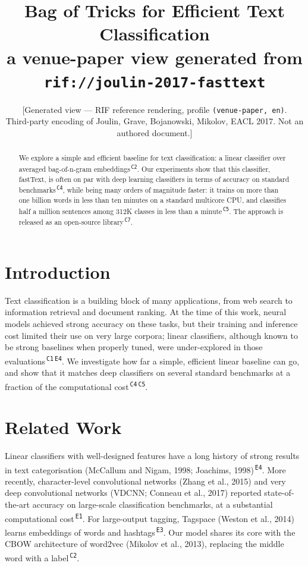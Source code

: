 \documentclass[10pt,twocolumn]{article}
\title{\large\bfseries Bag of Tricks for Efficient Text Classification\\[2pt]
\normalsize\mdseries a venue-paper view generated from \texttt{rif://joulin-2017-fasttext}}
\author{\small [Generated view --- RIF reference rendering, profile \texttt{(venue-paper, en)}.\\
\small Third-party encoding of Joulin, Grave, Bojanowski, Mikolov, EACL 2017. Not an authored document.]}
\date{}
\newcommand{\anch}[1]{\textsuperscript{\,\textcolor{anchor}{\tiny\texttt{#1}}}}
\begin{document}
\maketitle

\begin{abstract}
\noindent We explore a simple and efficient baseline for text classification: a linear classifier over averaged bag-of-n-gram embeddings\anch{C2}. Our experiments show that this classifier, fastText, is often on par with deep learning classifiers in terms of accuracy on standard benchmarks\anch{C4}, while being many orders of magnitude faster: it trains on more than one billion words in less than ten minutes on a standard multicore CPU, and classifies half a million sentences among 312K classes in less than a minute\anch{C5}. The approach is released as an open-source library\anch{C7}.
\end{abstract}

\section{Introduction}
Text classification is a building block of many applications, from web search to information retrieval and document ranking. At the time of this work, neural models achieved strong accuracy on these tasks, but their training and inference cost limited their use on very large corpora; linear classifiers, although known to be strong baselines when properly tuned, were under-explored in those evaluations\anch{C1}\anch{E4}. We investigate how far a simple, efficient linear baseline can go, and show that it matches deep classifiers on several standard benchmarks at a fraction of the computational cost\anch{C4}\anch{C5}.

\section{Related Work}
Linear classifiers with well-designed features have a long history of strong results in text categorisation (McCallum and Nigam, 1998; Joachims, 1998)\anch{E4}. More recently, character-level convolutional networks (Zhang et al., 2015) and very deep convolutional networks (VDCNN; Conneau et al., 2017) reported state-of-the-art accuracy on large-scale classification benchmarks, at a substantial computational cost\anch{E1}. For large-output tagging, Tagspace (Weston et al., 2014) learns embeddings of words and hashtags\anch{E3}. Our model shares its core with the CBOW architecture of word2vec (Mikolov et al., 2013), replacing the middle word with a label\anch{C2}.
\end{document}
